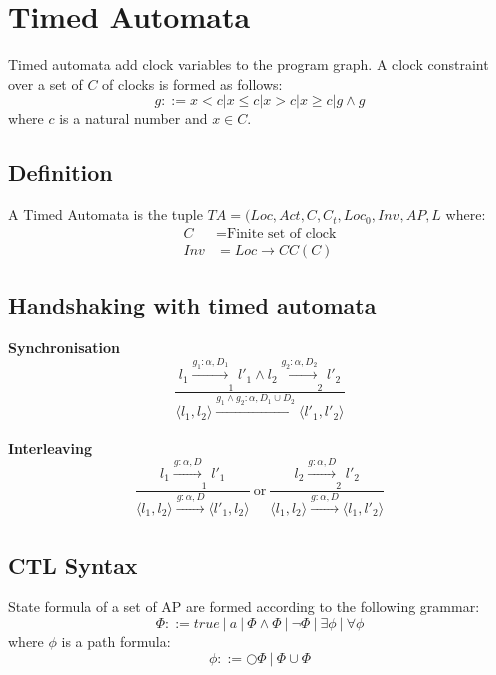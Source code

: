 \documentclass[11pt]{article}
\theoremstyle{definition}
\begin{document}
\section{Timed Automata}
Timed automata add clock variables to the program graph. A clock constraint over a set of $C$ of clocks is formed as follows:
\begin{equation}
g ::= x < c | x \leq c | x > c | x \geq c | g \wedge g
\end{equation}
where $c$ is a natural number and $x \in C$.
\subsection{Definition}
A Timed Automata is the tuple $TA = (Loc, Act, C, C_{t}, Loc_{0}, Inv, AP, L$ where:
\begin{align*}
C &= \text{Finite set of clock} \\
Inv &= Loc \rightarrow CC(C)
\end{align*}

\subsection{Handshaking with timed automata}
\textbf{Synchronisation}
\begin{equation}
\frac{l_{1} \xrightarrow[]{g_{1}:\alpha, D_{1}}_{1} l'_{1} \wedge l_{2} \xrightarrow[]{g_{2}:\alpha, D_{2}}_{2} l'_{2}}{\langle l_{1}, l_{2} \rangle \xrightarrow[]{g_{1} \wedge g_{2}:\alpha, D_{1} \cup D_{2}} \langle l'_{1}, l'_{2} \rangle}
\end{equation}

\textbf{Interleaving}
\begin{equation}
\frac{l_{1} \xrightarrow[]{g:\alpha, D}_{1} l'_{1}}{\langle l_{1}, l_{2} \rangle \xrightarrow[]{g:\alpha, D} \langle l'_{1}, l_{2} \rangle}\ \text{or}\ \frac{l_{2} \xrightarrow[]{g:\alpha, D}_{2} l'_{2}}{\langle l_{1}, l_{2} \rangle \xrightarrow[]{g:\alpha, D} \langle l_{1}, l'_{2} \rangle}
\end{equation}

\subsection{CTL Syntax}
State formula of a set of AP are formed according to the following grammar:
\begin{equation}
\Phi ::= true\ |\ a\ |\ \Phi \wedge \Phi\ |\ \neg \Phi\ |\ \exists \phi\ |\ \forall \phi
\end{equation}
where $\phi$ is a path formula:
\begin{equation}
\phi ::= \Circle \Phi\ |\ \Phi \cup \Phi
\end{equation}
\end{document}
